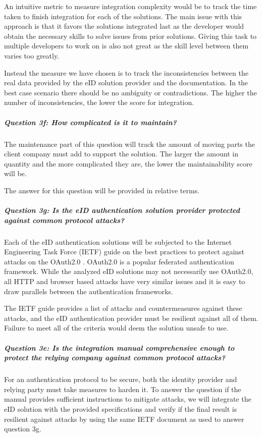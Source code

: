 An intuitive metric to measure integration complexity would be to track the time taken to finish integration for each of the solutions. The main issue with this approach is that it favors the solutions integrated last as the developer would obtain the necessary skills to solve issues from prior solutions. Giving this task to multiple developers to work on is also not great as the skill level between them varies too greatly.

Instead the measure we have chosen is to track the inconsistencies between the real data provided by the eID solution provider and the documentation. In the best case scenario there should be no ambiguity or contradictions. The higher the number of inconsistencies, the lower the score for integration.

\subparagraph{Question 3f: How complicated is it to maintain?}\noindent

The maintenance part of this question will track the amount of moving parts the client company must add to support the solution. The larger the amount in quantity and the more complicated they are, the lower the maintainability score will be.

The answer for this question will be provided in relative terms.

\subparagraph{Question 3g: Is the eID authentication solution provider protected against common protocol attacks?}\noindent

Each of the eID authentication solutions will be subjected to the Internet Engineering Task Force (IETF) guide on the best practices to protect against attacks on the OAuth2.0 \cite{ietf-oauth-security-topics-19}. OAuth2.0 \cite{rfc6749} is a popular federated authentication framework. While the analyzed eID solutions may not necessarily use OAuth2.0, all HTTP and browser based attacks have very similar issues and it is easy to draw parallels between the authentication frameworks.

The IETF guide provides a list of attacks and countermeasures against these attacks, and the eID authentication provider must be resilient against all of them. Failure to meet all of the criteria would deem the solution unsafe to use.

\subparagraph{Question 3e: Is the integration manual comprehensive enough to protect the relying company against common protocol attacks?}\noindent

For an authentication protocol to be secure, both the identity provider and relying party must take measures to harden it. To answer the question if the manual provides sufficient instructions to mitigate attacks, we will integrate the eID solution with the provided specifications and verify if the final result is resilient against attacks by using the same IETF document as used to answer question 3g.

